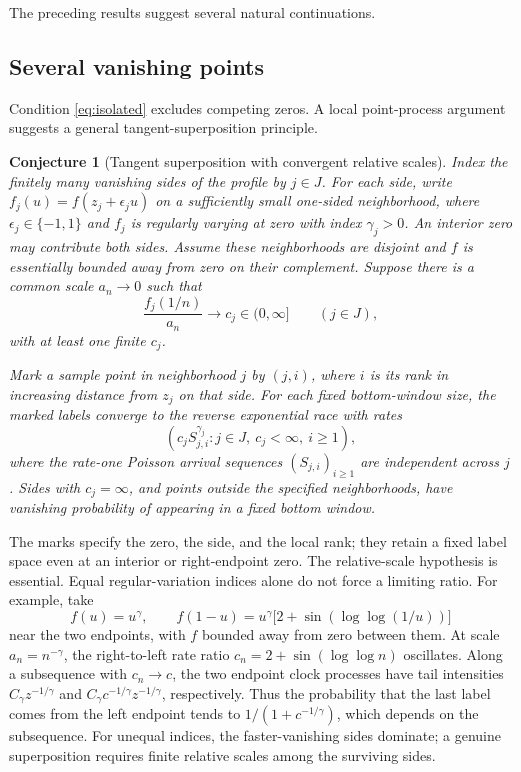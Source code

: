 \documentclass[11pt]{article}
\numberwithin{equation}{section}
\newtheorem{conjecture}[theorem]{Conjecture}
\theoremstyle{definition}
\theoremstyle{remark}
\begin{document}
The preceding results suggest several natural continuations.

\subsection{Several vanishing points}

Condition \eqref{eq:isolated} excludes competing zeros.  A local point-process argument suggests a general tangent-superposition principle.

\begin{conjecture}[Tangent superposition with convergent relative scales]
\label{conj:superposition}
Index the finitely many vanishing sides of the profile by $j\in J$.
For each side, write
$f_j(u)=f(z_j+\epsilon_j u)$ on a sufficiently small one-sided
neighborhood, where $\epsilon_j\in\{-1,1\}$ and $f_j$ is regularly
varying at zero with index $\gamma_j>0$.  An interior zero may
contribute both sides.  Assume these neighborhoods are disjoint and
$f$ is essentially bounded away from zero on their complement.
Suppose there is a common scale $a_n\to0$ such that
\[
 \frac{f_j(1/n)}{a_n}\longrightarrow c_j\in(0,\infty]
 \qquad(j\in J),
\]
with at least one finite $c_j$.

Mark a sample point in neighborhood $j$ by $(j,i)$, where $i$ is its
rank in increasing distance from $z_j$ on that side.  For each fixed
bottom-window size, the marked labels converge to the reverse
exponential race with rates
\[
 \left(c_j S_{j,i}^{\gamma_j}:
       j\in J,\ c_j<\infty,\ i\geq1\right),
\]
where the rate-one Poisson arrival sequences $(S_{j,i})_{i\geq1}$
are independent across $j$.  Sides with $c_j=\infty$, and points
outside the specified neighborhoods, have vanishing probability of
appearing in a fixed bottom window.
\end{conjecture}

The marks specify the zero, the side, and the local rank; they retain a
fixed label space even at an interior or right-endpoint zero.
The relative-scale hypothesis is essential.  Equal regular-variation
indices alone do not force a limiting ratio.  For example, take
\[
 f(u)=u^\gamma,\qquad
 f(1-u)=u^\gamma\bigl[2+\sin(\log\log(1/u))\bigr]
\]
near the two endpoints, with $f$ bounded away from zero between them.
At scale $a_n=n^{-\gamma}$, the right-to-left rate ratio
$c_n=2+\sin(\log\log n)$ oscillates.  Along a subsequence with
$c_n\to c$, the two endpoint clock processes have tail intensities
$C_\gamma z^{-1/\gamma}$ and
$C_\gamma c^{-1/\gamma}z^{-1/\gamma}$, respectively.  Thus the
probability that the last label comes from the left endpoint tends to
$1/(1+c^{-1/\gamma})$, which depends on the subsequence.
For unequal indices, the faster-vanishing sides dominate; a genuine
superposition requires finite relative scales among the surviving
sides.
\end{document}
